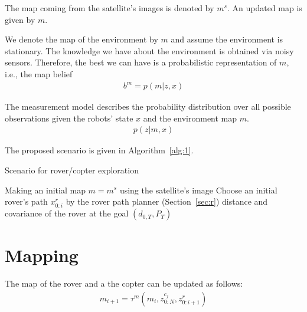 \documentclass[conference]{IEEEtran}
\begin{document}
The map coming from the satellite's images is denoted by $m^s$. An updated map is given by $m$. 

We denote the map of the environment by $m$ and assume the environment is stationary. The knowledge we have about the environment is obtained via noisy sensors. Therefore, the best we can have is a probabilistic representation of $m$, i.e., the map belief
\begin{align}
    b^m=p(m|z, x)
\end{align}

The measurement model describes the probability distribution over all possible observations given the robots' state $x$ and the environment map $m$.
\begin{align}
    p(z|m, x)
\end{align}

The proposed scenario is given in Algorithm~\ref{alg:1}.

\begin{algorithm}[!ht]
\caption{Scenario for rover/copter exploration}
\label{alg:1}
\DontPrintSemicolon
Making an initial map $m=m^s$ using the satellite's image\;
Choose an initial rover's path $x^r_{0:i}$ by the rover path planner (Section~\ref{sec:r})\;
\Return distance and covariance of the rover at the goal $(d_{0,T}, P_T)$
\end{algorithm}


\section{Mapping}


The map of the rover and a the copter can be updated as follows:
\begin{align}
m_{i+1} = \tau^m (m_{i}, z^{c_j}_{0:N}, z^r_{0:i+1})
\end{align}
\end{document}
